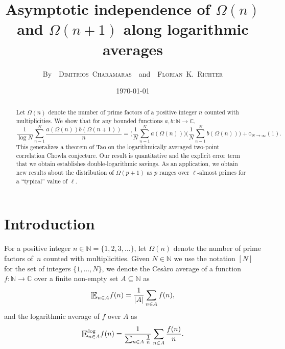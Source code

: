 \documentclass[letter,11pt]{article}
\author{By~~{\scshape Dimitrios~Charamaras}~~and~~{\scshape Florian~K.~Richter}}
\date{\small \today}
\title{\bfseries 
Asymptotic independence of $\Omega(n)$ and $\Omega(n+1)$ along logarithmic averages}
\theoremstyle{plain} %
\theoremstyle{definition} %
\theoremstyle{plain}
\theoremstyle{plain}
\theoremstyle{plain}
\numberwithin{equation}{section}
\newcommand{\Cesaro}{Ces\`{a}ro}
\newcommand{\oh}{{\mathrm o}}
\newcommand{\N}{\mathbb{N}}
\newcommand{\C}{\mathbb{C}}
\renewcommand{\subset}{\subseteq}
\newcommand{\E}{\raisebox{-0.4ex}{\scalebox{1.4}[1.3]{$\mathbb{E}$}}}
\newcommand{\Esub}[1]{\raisebox{-0.4ex}{\scalebox{1.4}[1.3]{$\mathbb{E}$}}\raisebox{-0.35ex}{\ensuremath{_{\scriptstyle #1}}}}
\newcommand{\logE}{{\E}^{\log}}
\newcommand{\1}{\mathbbm{1}}
\begin{document}
\maketitle


\begin{abstract}
Let $\Omega(n)$ denote the number of prime factors of a positive integer $n$ counted with multiplicities. We show that for any bounded functions $a,b\colon\N\to\C$,
$$\frac{1}{\log{N}}\sum_{n=1}^N \frac{a(\Omega(n))b(\Omega(n+1))}{n}
= \Bigg(\frac{1}{N}\sum_{n=1}^N a(\Omega(n))\Bigg)\Bigg(\frac{1}{N}\sum_{n=1}^N b(\Omega(n))\Bigg) + \oh_{N\to\infty}(1).$$
This generalizes a theorem of Tao on the logarithmically averaged two-point correlation Chowla conjecture.
Our result is quantitative and the explicit error term that we obtain establishes double-logarithmic savings.
As an application, we obtain new results about the distribution of $\Omega(p+1)$ as $p$ ranges over $\ell$-almost primes for a ``typical'' value of $\ell$.
\end{abstract}



\tableofcontents
\thispagestyle{empty}



\section{Introduction}\label{Intro}

For a positive integer $n\in\N=\{1,2,3,\ldots\}$, let $\Omega(n)$ denote the number of prime factors of~$n$ counted with multiplicities.
Given $N\in\N$ we use the notation $[N]$ for the set of integers $\{1,\ldots,N\}$, we denote the \Cesaro{} average of a function $f\colon\N\to\C$ over a finite non-empty set $A\subset\N$ as
$$\Esub{n\in A}f(n) = \frac{1}{|A|}\sum_{n\in A}f(n),$$
and the logarithmic average of $f$ over $A$ as 
$$\logE_{n\in A}f(n)=\frac{1}{\sum_{n\in A}\frac{1}{n}}\sum_{n\in A} \frac{f(n)}{n}.$$
\end{document}
